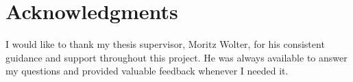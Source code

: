 



\bigskip

\begingroup
\let\clearpage\relax
\let\cleardoublepage\relax
\let\cleardoublepage\relax
\chapter*{Acknowledgments}
I would like to thank my thesis supervisor, Moritz Wolter, for his consistent guidance and support throughout this project.
He was always available to answer my questions and provided valuable feedback whenever I needed it.
\bigskip

\endgroup
